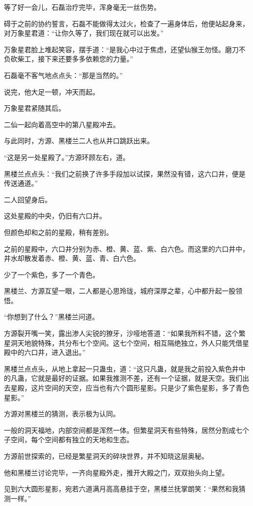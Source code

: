 \begin{this_body}
等了好一会儿，石磊治疗完毕，浑身毫无一丝伤势。

碍于之前的协约誓言，石磊不能做得太过火，检查了一遍身体后，他便站起身来，对万象星君道：“让你久等了，我们现在就可以出发。”

万象星君脸上堆起笑容，摆手道：“是我心中过于焦虑，还望仙猴王勿怪。磨刀不负砍柴工，接下来还要多多依赖您的力量。”

石磊毫不客气地点点头：“那是当然的。”

说完，他大足一顿，冲天而起。

万象星君紧随其后。

二仙一起向着高空中的第八星殿冲去。

与此同时，方源、黑楼兰二人也从井口跳跃出来。

“这是另一处星殿了。”方源环顾左右，道。

黑楼兰点点头：“我们之前换了许多手段加以试探，果然没有错，这六口井，便是传送通道。”

二人回望身后。

这处星殿的中央，仍旧有六口井。

但颜色却和之前的星殿，稍有差别。

之前的星殿中，六口井分别为赤、橙、黄、蓝、紫、白六色。而这里的六口井中，井水却散发着赤、橙、黄、蓝、青、白六色。

少了一个紫色，多了一个青色。

黑楼兰、方源互望一眼，二人都是心思玲珑，城府深厚之辈，心中都升起一股领悟。

“你想到了什么？”黑楼兰问道。

方源裂开嘴一笑，露出渗人尖锐的獠牙，沙哑地答道：“如果我所料不错，这个繁星洞天地貌特殊，共分布七个空间。这七个空间，相互隔绝独立，外人只能凭借星殿中的六口井，进入退出。”

黑楼兰点点头，从地上拿起一只蛊虫，道：“这只凡蛊，就是我之前投入紫色井中的凡蛊，它就是最好的证据。如果我推测不差，还有一个证据，就是天空。我们出去星殿，这片空间的天空，应当也有六个圆形星影。只是少了紫色星影，多了青色星影。”

方源对黑楼兰的猜测，表示极为认同。

一般的洞天福地，内部空间都是浑然一体。但繁星洞天有些特殊，居然分割成七个子空间，每个空间都有独立的天地和生态。

方源前世探索的，已经是繁星洞天的碎块世界，并不知晓这层奥秘。

他和黑楼兰讨论完毕，一齐向星殿外走，推开大殿之门，双双抬头向上望。

见到六大圆形星影，宛若六道满月高高悬挂于空，黑楼兰抚掌朗笑：“果然和我猜测一样。”


\end{this_body}
